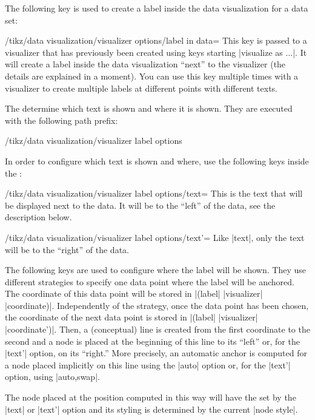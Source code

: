 The following key is used to create a label inside the data
visualization for a data set:

\begin{key}{/tikz/data visualization/visualizer options/label in data=}
  This key is passed to a visualizer that has previously been created
  using keys starting |visualize as ...|. It will create a label
  inside the data visualization ``next'' to the visualizer (the
  details are explained in a moment). You can use this key multiple
  times with a visualizer to create multiple labels at different
  points with different texts.

  The  determine which text is shown and where it is
  shown. They are executed with the following path prefix:
\begin{codeexample}
/tikz/data visualization/visualizer label options
\end{codeexample}

  In order to configure which text is shown and where, use the
  following keys inside the :
  
  \begin{key}{/tikz/data visualization/visualizer label options/text=}
    This is the text that will be displayed next to the data. It will
    be to the ``left'' of the data, see the description below.
  \end{key}
  \begin{key}{/tikz/data visualization/visualizer label options/text'=}
    Like |text|, only the text will be to the ``right'' of the data.
  \end{key}
  
  The following keys are used to configure where the label will be
  shown. They use different strategies to specify one data point where
  the label will be anchored. The coordinate of this data point will
  be stored in |(label| |visualizer| |coordinate)|. Independently of
  the strategy, once the data point has been chosen, the coordinate of
  the next data point is stored in |(label| |visualizer|
  |coordinate')|. Then, a (conceptual) line is created from the first
  coordinate to the second and a node is placed at the beginning of
  this line to its ``left'' or, for the |text'| option, on its
  ``right.'' More precisely, an automatic anchor is computed for a
  node placed implicitly on this line using the |auto| option or, for
  the |text'| option, using |auto,swap|.

  The node placed at the position computed in this way will have the
   set by the |text| or |text'| option and its styling is
  determined by the current |node style|.
  

\end{key}
